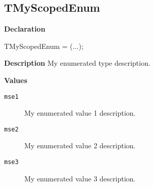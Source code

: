 \documentclass{report}
\newif\ifpdf
\begin{document}
\subsection*{TMyScopedEnum}
\fi
\label{ok_enum_links-TMyScopedEnum}
\begin{list}{}{
\setlength{\itemindent}{0cm}
\setlength{\listparindent}{0cm}
\setlength{\leftmargin}{\evensidemargin}
\addtolength{\leftmargin}{\tmplength}
\settowidth{\labelsep}{X}
\addtolength{\leftmargin}{\labelsep}
\setlength{\labelwidth}{\tmplength}
}
\item[\textbf{Declaration}\hfill]
\ifpdf
\begin{flushleft}
\fi
\begin{ttfamily}
TMyScopedEnum = (...);\end{ttfamily}

\ifpdf
\end{flushleft}
\fi

\par
\item[\textbf{Description}]
My enumerated type description.\item[\textbf{Values}]
\begin{description}
\item[\texttt{mse1}] \label{ok_enum_links-mse1}
\index{}
My enumerated value 1 description.
\item[\texttt{mse2}] \label{ok_enum_links-mse2}
\index{}
My enumerated value 2 description.
\item[\texttt{mse3}] \label{ok_enum_links-mse3}
\index{}
My enumerated value 3 description.
\end{description}


\end{list}
\end{document}

